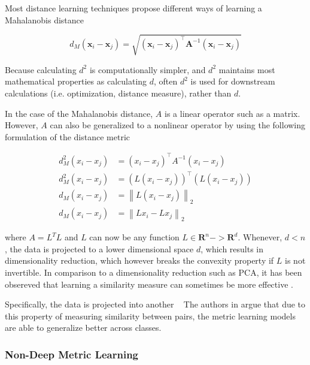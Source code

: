 \documentclass[a4paper,12pt,twoside,openright]{report}
\begin{document}
Most distance learning techniques propose different ways of learning a Mahalanobis distance \cite{mahalanobis36}

\begin{equation}
d_{M}\left(\boldsymbol{x}_{i}-\boldsymbol{x}_{j}\right)=\sqrt{\left(\boldsymbol{x}_{i}-\boldsymbol{x}_{j}\right)^{\top} \boldsymbol{A}^{-1}\left(\boldsymbol{x}_{i}-\boldsymbol{x}_{j}\right)}
\end{equation}

Because calculating $d^2$ is computationally simpler, and $d^2$ maintains most mathematical properties as calculating $d$, often $d^2$ is used for downstream calculations (i.e. optimization, distance measure), rather than $d$.

In the case of the Mahalanobis distance, $A$ is a linear operator such as a matrix.
However, $A$ can also be generalized to a nonlinear operator by using the following formulation of the distance metric

\begin{align}
d_{M}^{2}\left(x_{i}-x_{j}\right) &=\left(x_{i}-x_{j}\right)^{\top} A^{-1}\left(x_{i}-x_{j}\right) \\
d_{M}^{2}\left(x_{i}-x_{j}\right) &= (L\left(x_{i}-x_{j}\right))^{\top} (L\left(x_{i}-x_{j}\right)) \\
d_{M}\left(x_{i}-x_{j}\right) &=\left\|L\left(x_{i}-x_{j}\right)\right\|_{2} \\
d_{M}\left(x_{i}-x_{j}\right) &=\left\|Lx_{i}-Lx_{j}\right\|_{2}
\end{align}

where $A = L^T L$ and $L$ can now be any function $L \in \mathbf{R}^n -> \mathbf{R}^d$. 
Whenever, $d < n$, the data is projected to a lower dimensional space $d$, which results in dimensionality reduction, which however breaks the convexity property if $L$ is not invertible.
In comparison to a dimensionality reduction such as PCA, it has been obsereved that learning a similarity measure can sometimes be more effective \cite{chechik10}.

Specifically, the data is projected into another  \
The authors in \cite{moutafis17} argue that due to this property of measuring similarity between pairs, the metric learning models are able to generalize better across classes.

\subsubsection{Non-Deep Metric Learning}
\end{document}
